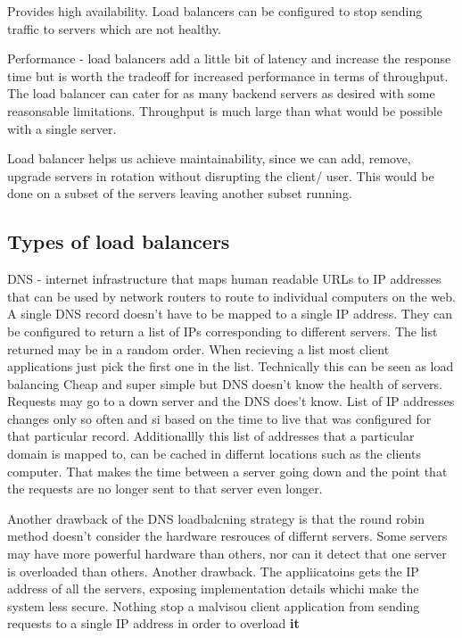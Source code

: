 \documentclass[a4paper, 11pt]{book}
\begin{document}
    Provides high availability. Load balancers can be configured to stop sending traffic to servers which are not healthy.

    Performance - load balancers add a little bit of latency and increase the response time but is worth the tradeoff for increased performance in terms of throughput.
    The load balancer can cater for as many backend servers as desired with some reasonsable limitations.
    Throughput is much large than what would be possible with a single server.

    Load balancer helps us achieve maintainability, since we can add, remove, upgrade servers in rotation without disrupting the client/ user.
    This would be done on a subset of the servers leaving another subset running.

    \subsection{Types of load balancers}
    DNS - internet infrastructure that maps human readable URLs to IP addresses that can be used by network routers to route to individual computers on the web.
    A single DNS record doesn't have to be mapped to a single IP address. They can be configured to return a list of IPs corresponding to different servers.
    The list returned may be in a random order.
    When recieving a list most client applications just pick the first one in the list.
    Technically this can be seen as load balancing
    Cheap and super simple but DNS doesn't know the health of servers.
    Requests may go to a down server and the DNS does't know.
    List of IP addresses changes only so often and si based on the time to live that was configured for that particular record.
    Additionallly this list of addresses that a particular domain is mapped to, can be cached in differnt locations such as the clients computer.
    That makes the time between a server going down and the point that the requests are no longer sent to that server even longer.

    Another drawback of the DNS loadbalcning strategy is that the round robin method doesn't consider the hardware resrouces of differnt servers.
    Some servers may have more powerful hardware than others, nor can it detect that one server is overloaded than others.
    Another drawback. The appliicatoins gets the IP address of all the servers, exposing implementation details whichi make the system less secure.
    Nothing stop a malvisou client application from sending requests to a single IP address in order to overload \textbf{it}
\end{document}
